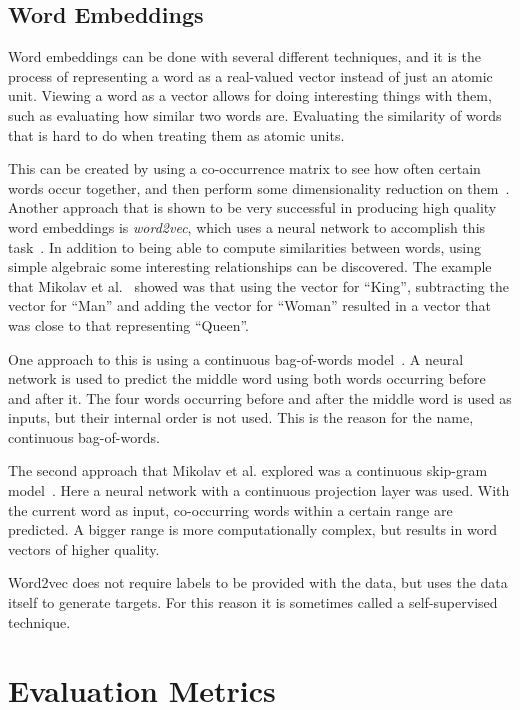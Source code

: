 \subsection{Word Embeddings}

Word embeddings can be done with several different techniques, and it is the process of representing a word as a real-valued vector instead of just an atomic unit.
Viewing a word as a vector allows for doing interesting things with them, such as evaluating how similar two words are.
Evaluating the similarity of words that is hard to do when treating them as atomic units.

This can be created by using a co-occurrence matrix to see how often certain words occur together, and then perform some dimensionality reduction on them~\cite{lebret2013word, levy2014neural}.
Another approach that is shown to be very successful in producing high quality word embeddings is \textit{word2vec}, which uses a neural network to accomplish this task~\cite{mikolov2013efficient}.
In addition to being able to compute similarities between words, using simple algebraic some interesting relationships can be discovered.
The example that Mikolav et al\@.~\cite{mikolov2013efficient} showed was that using the vector for ``King'', subtracting the vector for ``Man'' and adding the vector for ``Woman'' resulted in a vector that was close to that representing ``Queen''.

One approach to this is using a continuous bag-of-words model~\cite{mikolov2013efficient}.
A neural network is used to predict the middle word using both words occurring before and after it.
The four words occurring before and after the middle word is used as inputs, but their internal order is not used.
This is the reason for the name, continuous bag-of-words.

The second approach that Mikolav et al\@. explored was a continuous skip-gram model~\cite{mikolov2013efficient}.
Here a neural network with a continuous projection layer was used.
With the current word as input, co-occurring words within a certain range are predicted.
A bigger range is more computationally complex, but results in word vectors of higher quality.

Word2vec does not require labels to be provided with the data, but uses the data itself to generate targets.
For this reason it is sometimes called a self-supervised technique.

\section{Evaluation Metrics}\label{sec:evaluation-metrics}


